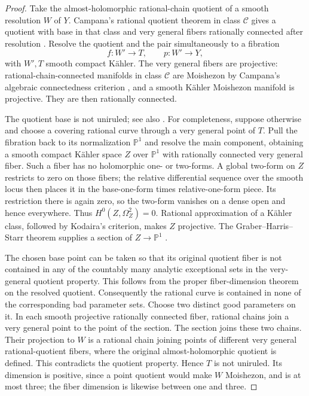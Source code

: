 \documentclass[11pt,letterpaper]{article}
\theoremstyle{definition}
\theoremstyle{remark}
\begin{document}
\begin{proof}
Take the almost-holomorphic rational-chain quotient of a smooth
resolution \(W\) of \(Y\). Campana's rational quotient theorem in class
\(\mathcal C\) gives a quotient with base in that class and very general
fibers rationally connected after resolution
\cite[Theorem~2.6]{CampanaRationalQuotient}. Resolve the quotient and
the pair simultaneously to a fibration
\[
 f:W'\longrightarrow T,\qquad p:W'\longrightarrow Y,
\]
with \(W',T\) smooth compact Kähler. The very general fibers are
projective: rational-chain-connected manifolds in class \(\mathcal C\)
are Moishezon by Campana's algebraic connectedness criterion
\cite{CampanaAlgebraicConnectedness}, and a smooth Kähler Moishezon
manifold is projective. They are then rationally connected.

The quotient base is not uniruled; see also \cite[Lemma~8.10]{OuUniruledness}.
For completeness, suppose otherwise and choose a covering rational
curve through a very general point of \(T\). Pull the fibration back
to its normalization \(\mathbb{P}^1\) and resolve the main component, obtaining
a smooth compact Kähler space \(Z\) over \(\mathbb{P}^1\) with rationally
connected very general fiber. Such a fiber has no holomorphic one- or
two-forms. A global two-form on \(Z\) restricts to zero on those fibers;
the relative differential sequence over the smooth locus then places
it in the base-one-form times relative-one-form piece. Its restriction
there is again zero, so the two-form vanishes on a dense open and hence
everywhere. Thus \(H^0(Z,\Omega_Z^2)=0\). Rational approximation of a
Kähler class, followed by Kodaira's criterion, makes \(Z\) projective.
The Graber--Harris--Starr theorem supplies a section of
\(Z\to\mathbb{P}^1\) \cite{GraberHarrisStarr}.

The chosen base point can be taken so that its original quotient fiber
is not contained in any of the countably many analytic exceptional
sets in the very-general quotient property. This follows from the
proper fiber-dimension theorem on the resolved quotient. Consequently
the rational curve is contained in none of the corresponding bad
parameter sets. Choose two distinct good parameters on it. In each
smooth projective rationally connected fiber, rational chains join a
very general point to the point of the section. The section joins
these two chains. Their projection to \(W\) is a rational chain joining
points of different very general rational-quotient fibers, where the
original almost-holomorphic quotient is defined. This contradicts the
quotient property. Hence \(T\) is not uniruled. Its dimension is
positive, since a point quotient would make \(W\) Moishezon, and is at
most three; the fiber dimension is likewise between one and three.


\end{proof}
\end{document}
